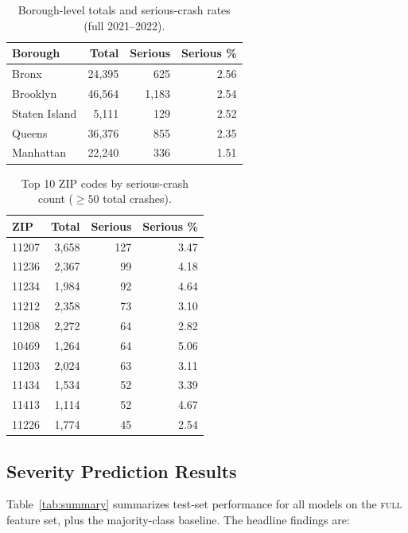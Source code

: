 \documentclass{article}
\begin{document}
\begin{table}[h]
\centering
\caption{Borough-level totals and serious-crash rates (full 2021--2022).}
\label{tab:borough}
\begin{tabular}{lrrr}
\toprule
Borough & Total & Serious & Serious \% \\
\midrule
Bronx          & 24{,}395 & 625   & 2.56 \\
Brooklyn       & 46{,}564 & 1{,}183 & 2.54 \\
Staten Island  & 5{,}111  & 129   & 2.52 \\
Queens         & 36{,}376 & 855   & 2.35 \\
Manhattan      & 22{,}240 & 336   & 1.51 \\
\bottomrule
\end{tabular}
\end{table}

\begin{table}[h]
\centering
\caption{Top 10 ZIP codes by serious-crash count (\(\geq 50\) total crashes).}
\label{tab:zip}
\begin{tabular}{lrrr}
\toprule
ZIP & Total & Serious & Serious \% \\
\midrule
11207 & 3{,}658 & 127 & 3.47 \\
11236 & 2{,}367 &  99 & 4.18 \\
11234 & 1{,}984 &  92 & 4.64 \\
11212 & 2{,}358 &  73 & 3.10 \\
11208 & 2{,}272 &  64 & 2.82 \\
10469 & 1{,}264 &  64 & 5.06 \\
11203 & 2{,}024 &  63 & 3.11 \\
11434 & 1{,}534 &  52 & 3.39 \\
11413 & 1{,}114 &  52 & 4.67 \\
11226 & 1{,}774 &  45 & 2.54 \\
\bottomrule
\end{tabular}
\end{table}

\subsection{Severity Prediction Results}
Table~\ref{tab:summary} summarizes test-set performance for all models on the
\textsc{full} feature set, plus the majority-class baseline. The headline
findings are:
\end{document}
